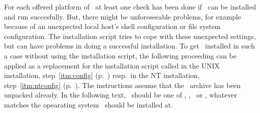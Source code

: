 For each offered platform of \plob\ at least one check has been done
if \plob\ can be installed and run succesfully. But, there might be
unforeseeable problems, for example because of an unexpected local
host's shell configuration or file system configuration. The
installation script tries to cope with these unexpected settings, but
can have problems in doing a successful installation. To get \plob\
installed in such a case without using the installation script, the
following proceeding can be applied as a replacement for the
installation script called in the UNIX installation,
step~\ref{itm:config} (p.\ \pageref{itm:config}) resp.\ in the NT
installation, step~\ref{itm:ntconfig} (p.\
\pageref{itm:ntconfig}). The instructions assume that the \plob\
archive has been unpacked already. In the following text,
\shortosname\ should be one of \lisp{irix}, ,
\lisp{solaris}\ or \lisp{win32}, whatever matches the opearating
system \plob\ should be installed at.

